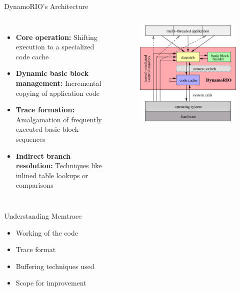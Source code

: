 \documentclass[aspectratio=169]{beamer}
\begin{document}
\begin{frame}{DynamoRIO's Architecture}
    \begin{columns}
            \begin{itemize}
                \item \textbf{Core operation:} Shifting execution to a specialized code cache
                \item \textbf{Dynamic basic block management:} Incremental copying of application code
                \item \textbf{Trace formation:} Amalgamation of frequently executed basic block sequences
                \item \textbf{Indirect branch resolution:} Techniques like inlined table lookups or comparisons
            \end{itemize}
            \begin{figure}
                \includegraphics[width=.7\linewidth]{Arch2.png}
            \end{figure}
    \end{columns}
    
\end{frame}

\begin{frame}{Understanding Memtrace}
    \begin{itemize}
        \item Working of the code
        \item Trace format
        \item Buffering techniques used
        \item Scope for improvement       
    \end{itemize}
    
\end{frame}
\end{document}
